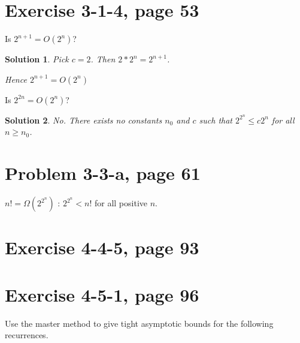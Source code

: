 \documentclass[letterpaper, 11pt]{article}
\theoremstyle{mystyle}
\newtheorem*{sln}{Solution}
\begin{document}
\section{Exercise 3-1-4, page 53}
Is $2^{n+1} = O(2^n)$? 

\begin{sln}
    Pick $c=2$. Then $2 * 2^n = 2^{n+1}$. 

    Hence $2^{n+1} = O(2^n)$
\end{sln}

Is $2^{2n} = O(2^n)$?

\begin{sln}
    No. There exists no constants $n_0$ and $c$ such that $2^{2^n} \leq c2^n$
    for all $n \geq n_0$. 
\end{sln}


\section{Problem 3-3-a, page 61}

\begin{compactitem} 
    \item $n! = \Omega(2^{2^n})$ : $2^{2^n} < n!$ for all positive $n$. 

\end{compactitem}


\section{Exercise 4-4-5, page 93}


\section{Exercise 4-5-1, page 96}
Use the master method to give tight asymptotic bounds for the following recurrences.
\end{document}
